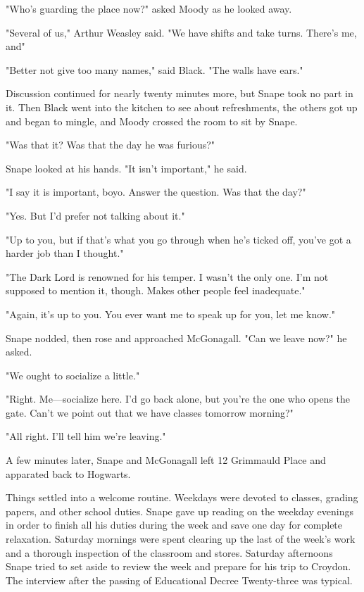 "Who's guarding the place now?" asked Moody as he looked away.

"Several of us," Arthur Weasley said. "We have shifts and take turns. There's me, and{\el}"

"Better not give too many names," said Black. "The walls have ears."

Discussion continued for nearly twenty minutes more, but Snape took no part in it. Then Black went into the kitchen to see about refreshments, the others got up and began to mingle, and Moody crossed the room to sit by Snape.

"Was that it? Was that the day he was furious?"

Snape looked at his hands. "It isn't important," he said.

"I say it is important, boyo. Answer the question. Was that the day?"

"Yes. But I'd prefer not talking about it."

"Up to you, but if that's what you go through when he's ticked off, you've got a harder job than I thought."

"The Dark Lord is renowned for his temper. I wasn't the only one. I'm not supposed to mention it, though. Makes other people feel inadequate."

"Again, it's up to you. You ever want me to speak up for you, let me know."

Snape nodded, then rose and approached McGonagall. "Can we leave now?" he asked.

"We ought to socialize a little."

"Right. Me—socialize here. I'd go back alone, but you're the one who opens the gate. Can't we point out that we have classes tomorrow morning?"

"All right. I'll tell him we're leaving."

A few minutes later, Snape and McGonagall left 12 Grimmauld Place and apparated back to Hogwarts.

\sbreak

Things settled into a welcome routine. Weekdays were devoted to classes, grading papers, and other school duties. Snape gave up reading on the weekday evenings in order to finish all his duties during the week and save one day for complete relaxation. Saturday mornings were spent clearing up the last of the week's work and a thorough inspection of the classroom and stores. Saturday afternoons Snape tried to set aside to review the week and prepare for his trip to Croydon. The interview after the passing of Educational Decree Twenty-three was typical.

